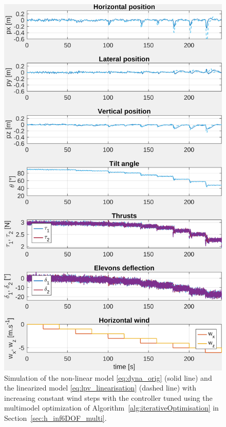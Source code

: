 \begin{figure}[ht!]
    \centering
    \includegraphics[trim=0cm 0cm 0cm 0cm,clip,width=0.9\columnwidth]{figures/sim_systune_lpv_noise.png}
    \caption{Simulation of the non-linear model \eqref{eq:dyna_orig} (solid line) and the linearized model  \eqref{eq:lpv_linearisation} (dashed line) with increasing constant wind steps with the controller tuned using the multimodel optimization of Algorithm~\ref{alg:iterativeOptimisation} in  Section~\ref{sec:h_inf6DOF_multi}.}
    \label{fig:SimSytuneStruct_lpv}
\end{figure}

